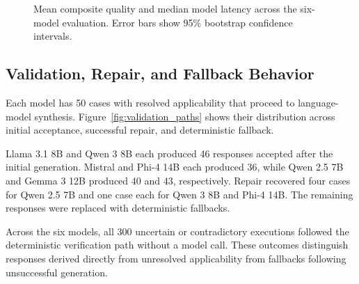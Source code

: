 \documentclass[conference]{IEEEtran}
\begin{document}
\begin{figure}[!ht]
\caption{Mean composite quality and median model latency across
the six-model evaluation. Error bars show 95\% bootstrap
confidence intervals.}
\label{fig:quality_latency}
\end{figure}

\subsection{Validation, Repair, and Fallback Behavior}

Each model has 50 cases with resolved applicability that proceed to
language-model synthesis. Figure~\ref{fig:validation_paths} shows their
distribution across initial acceptance, successful repair, and
deterministic fallback.

Llama 3.1 8B and Qwen 3 8B each produced 46 responses accepted after the
initial generation. Mistral and Phi-4 14B each produced 36, while
Qwen 2.5 7B and Gemma 3 12B produced 40 and 43, respectively.
Repair recovered four cases for Qwen 2.5 7B and one case each for
Qwen 3 8B and Phi-4 14B. The remaining responses were replaced
with deterministic fallbacks.

Across the six models, all 300 uncertain or contradictory executions
followed the deterministic verification path without a model call.
These outcomes distinguish responses derived directly from unresolved
applicability from fallbacks following unsuccessful generation.
\end{document}
